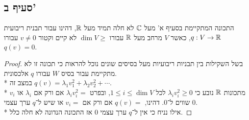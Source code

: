 \subsection{סעיף ב'}
התכונה המתקיימת בסעיף א' מעל $\mathbb{C}$ לא חלה תמיד מעל $\mathbb{R}$,
דהינו עבור תבנית ריבועית $q : V \to \mathbb{R}$, כאשר $V$ מרחב מעל $\mathbb{R}$ עבורו $\dim V \ge $ לא קיים וקטור $v \ne 0$ עבורו $q(v) = 0$.
\begin{proof}
	בשל השקילות בין תבניות ריבועיות מעל בסיסים שונים נוכל להראות כי תכונה זו לא מתקיימת עבור בסיס $W$ עבורו $q$ אלכסונית. \\*
	במצב זה $q(v) = \lambda_1 v_1^2 + \lambda_2 v_2^2 + \cdots$. \\*
	מתכונות $\mathbb{R}$ נובע כי $\lambda_i v_i^2 \ge 0$ לכל $1 \le i \le \dim V$,
	ובפרט $\lambda_i v_i^2 = $ אם ורק אם $\lambda_i$ או $v_i$ שווים ל־$0$.
	דהינו, $q(v) = $ אם ורק אם $v_i = $ או שיש ל־$q$ ערך עצמי $0$. \\*
	אילו נניח כי אין ל־$q$ ערך עצמי $0$ אז התכונה הנדונה לא חלה כלל.
\end{proof}

